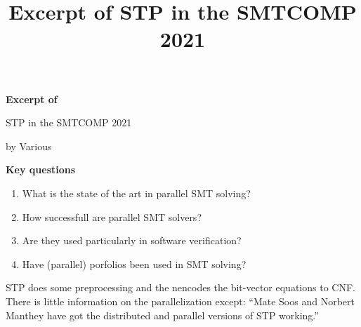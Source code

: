 \documentclass{scrartcl}
\title{Excerpt of STP in the SMTCOMP 2021}
\begin{document}
\begin{center}
    \Large{\textbf{Excerpt of}}

    \LARGE{STP in the SMTCOMP 2021}

    \large{by Various}
\end{center}

\vspace{1cm}

\begin{addmargin}[0.2\linewidth]{0.2\linewidth}
    \begin{center}
        \textbf{Key questions}
    \end{center}
    \begin{enumerate}[i]
        \item What is the state of the art in parallel SMT solving?
        \item How successfull are parallel SMT solvers?
        \item Are they used particularly in software verification?
        \item Have (parallel) porfolios been used in SMT solving?
    \end{enumerate}
\end{addmargin}

\vspace{1cm}
STP does some preprocessing and the nencodes the bit-vector equations to CNF.
There is little information on the parallelization except:
\enquote{Mate Soos and Norbert Manthey have got the distributed and parallel versions of
STP working.}
\end{document}
